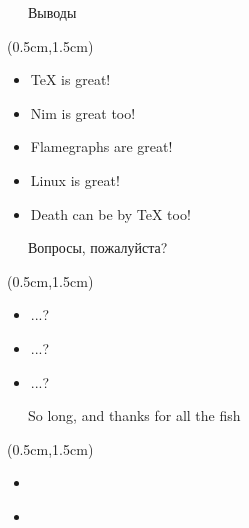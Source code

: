 \documentclass[xetex,18pt,aspectratio=43]{beamer}
\begin{document}
\begin{Large}

\begin{frame}{\ \ \ Выводы}
\begin{textblock*}{\framewidth-0.8cm}(0.5cm,1.5cm) %
\begin{itemize}
  \item TeX is great!
  \item Nim is great too!
  \item Flamegraphs are great!
  \item Linux is great!
  \item Death can be by {\TeX} too!
\end{itemize}
\end{textblock*}
\end{frame}

\begin{frame}{\ \ \ Вопросы, пожалуйста?}
\begin{textblock*}{\framewidth-0.8cm}(0.5cm,1.5cm)
\begin{itemize}
  \item ...?
  \item ...?
  \item ...?
\end{itemize}
\end{textblock*}
\end{frame}

\begin{frame}{\ \ \ So long, and thanks for all the fish}
\begin{textblock*}{\framewidth-0.8cm}(0.5cm,1.5cm)
\begin{itemize}
  \item \href{mailto:achistyakov@dataart.com}{\color{blue}{achistyakov@dataart.com}}
  \item \href{https://telegram.me/lhommequipleure}{\color{blue}{https://telegram.me/lhommequipleure}}
\end{itemize}
\end{textblock*}
\end{frame}
\end{Large}
\end{document}
